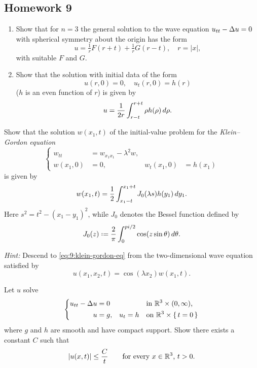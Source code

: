 \subsection{Homework 9}
\begin{problem}
  \begin{enumerate}[label=(\alph*),noitemsep]
  \item Show that for \(n=3\) the general solution to the wave equation
    \(u_{tt}-\Delta u=0\) with spherical symmetry about the origin has the
    form
    \[
      u=\tfrac{1}{r}F(r+t)+\tfrac{1}{r}G(r-t),\quad r=|x|,
    \]
    with suitable \(F\) and \(G\).
  \item Show that the solution with initial data of the form
    \[
      u(r,0)=0,\quad u_t(r,0)=h(r)
    \]
    (\(h\) is an even function of \(r\)) is given by
    \[
      u=\frac{1}{2r}\int_{r-t}^{r+t} \rho h(\rho)\mathop{}\!d \rho.
    \]
  \end{enumerate}
\end{problem}
\begin{solution*}
\end{solution*}

\begin{problem}
  Show that the solution \(w(x_1,t)\) of the initial-value problem for the
  \emph{Klein--Gordon equation}
  \begin{equation}
    \label{eq:9:klein-gordon-eq}
    \left\{
      \begin{aligned}
        w_{tt}&=w_{x_1x_1}-\lambda^2w,\\
        w(x_1,0)&=0,&w_t(x_1,0)&=h(x_1)
      \end{aligned}
    \right.
  \end{equation}
  is given by
  \[
    w(x_1,t)=\frac{1}{2}\int_{x_1-t}^{x_1+t}J_0(\lambda s) h(y_1)\mathop{}\!d y_1.
  \]
  Here \(s^2=t^2-(x_1-y_1)^2\), while \(J_0\) denotes the Bessel function
  defined by
  \[
    J_0(z)\defeq \frac{2}{\pi}\int_0^{pi/2}\cos(z\sin\theta)\diff\theta.
  \]

  \noindent\emph{Hint:} Descend to \eqref{eq:9:klein-gordon-eq} from the
  two-dimensional wave equation satisfied by
  \[
    u(x_1,x_2,t)=\cos(\lambda x_2)w(x_1,t).
  \]
\end{problem}
\begin{solution*}
\end{solution*}

\begin{problem}
  Let \(u\) solve
  \[
    \left\{
      \begin{aligned}
        u_{tt}-\Delta u&=0&&&&\text{in \(\mathbb{R}^3\times(0,\infty)\),}\\
        u&=g,&u_t&=h&&\text{on \(\mathbb{R}^3\times\{\,t=0\,\}\)}
      \end{aligned}
    \right.
  \]
  where \(g\) and \(h\) are smooth and have compact support. Show there
  exists a constant \(C\) such that
  \[
    |u(x,t)|\leq \frac{C}{t}\qquad \text{for every \(x\in\mathbb{R}^3\), \(t>0\).}
  \]
\end{problem}
\begin{solution*}
\end{solution*}

